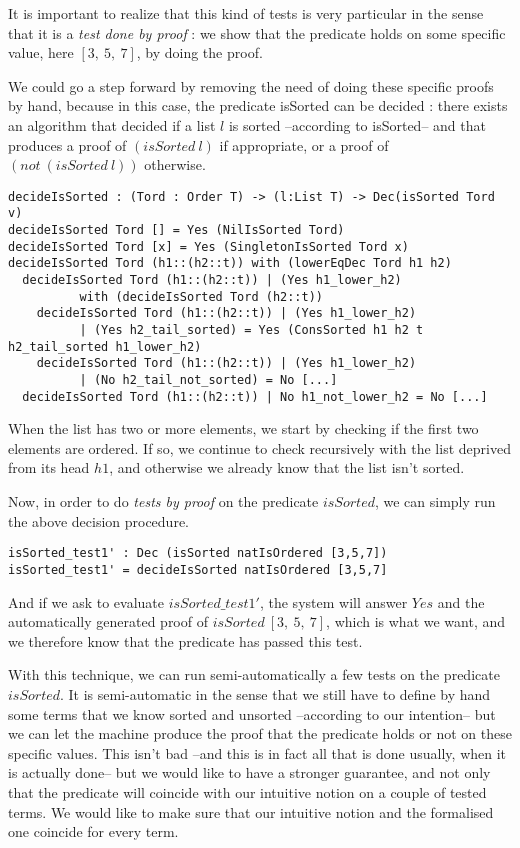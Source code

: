 It is important to realize that this kind of tests is very particular in the sense that it is a \emph{test done by proof} : we show that the predicate holds on some specific value, here $[3,\ 5,\ 7]$, by doing the proof.

We could go a step forward by removing the need of doing these specific proofs by hand, because in this case, the predicate isSorted can be decided : there exists an algorithm that decided if a list $l$ is sorted --according to isSorted-- and that produces a proof of $(isSorted\ l)$ if appropriate, or a proof of $(not\ (isSorted\ l))$ otherwise.

\begin{lstlisting}
decideIsSorted : (Tord : Order T) -> (l:List T) -> Dec(isSorted Tord v)
decideIsSorted Tord [] = Yes (NilIsSorted Tord)
decideIsSorted Tord [x] = Yes (SingletonIsSorted Tord x)
decideIsSorted Tord (h1::(h2::t)) with (lowerEqDec Tord h1 h2)
  decideIsSorted Tord (h1::(h2::t)) | (Yes h1_lower_h2) 
          with (decideIsSorted Tord (h2::t))
    decideIsSorted Tord (h1::(h2::t)) | (Yes h1_lower_h2) 
          | (Yes h2_tail_sorted) = Yes (ConsSorted h1 h2 t h2_tail_sorted h1_lower_h2)
    decideIsSorted Tord (h1::(h2::t)) | (Yes h1_lower_h2) 
          | (No h2_tail_not_sorted) = No [...]
  decideIsSorted Tord (h1::(h2::t)) | No h1_not_lower_h2 = No [...]
\end{lstlisting}

When the list has two or more elements, we start by checking if the first two elements are ordered. If so, we continue to check recursively with the list deprived from its head $h1$, and otherwise we already know that the list isn't sorted. 

Now, in order to do \emph{tests by proof} on the predicate $isSorted$, we can simply run the above decision procedure.

\begin{lstlisting}
isSorted_test1' : Dec (isSorted natIsOrdered [3,5,7])
isSorted_test1' = decideIsSorted natIsOrdered [3,5,7] 
\end{lstlisting}

And if we ask to evaluate $isSorted\_test1'$, the system will answer $Yes$ and the automatically generated proof of $isSorted\ [3,\ 5,\ 7]$, which is what we want, and we therefore know that the predicate has passed this test.

With this technique, we can run semi-automatically a few tests on the predicate $isSorted$. It is semi-automatic in the sense that we still have to define by hand some terms that we know sorted and unsorted --according to our intention-- but we can let the machine produce the proof that the predicate holds or not on these specific values. This isn't bad --and this is in fact all that is done usually, when it is actually done-- but we would like to have a stronger guarantee, and not only that the predicate will coincide with our intuitive notion on a couple of tested terms. We would like to make sure that our intuitive notion and the formalised one coincide for every term.





